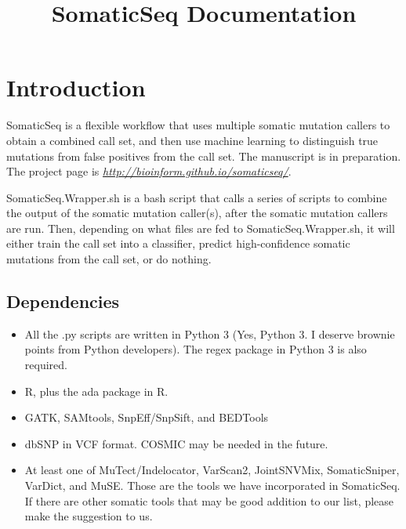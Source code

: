 \documentclass[10pt,letterpaper]{article}
\title{SomaticSeq Documentation}
\begin{document}
\maketitle



\begin{sloppypar}




\section{Introduction}

SomaticSeq is a flexible workflow that uses multiple somatic mutation callers to obtain a combined call set, and then use machine learning to distinguish true mutations from false positives from the call set. The manuscript is in preparation. The project page is \href{http://bioinform.github.io/somaticseq/}{\textit{http://bioinform.github.io/somaticseq/}}. 

SomaticSeq.Wrapper.sh is a bash script that calls a series of scripts to combine the output of the somatic mutation caller(s), after the somatic mutation callers are run. Then, depending on what files are fed to SomaticSeq.Wrapper.sh, it will either train the call set into a classifier, predict high-confidence somatic mutations from the call set, or do nothing. 

\subsection{Dependencies}

\begin{itemize}

\item
All the .py scripts are written in Python 3 (Yes, Python 3. I deserve brownie points from Python developers). The regex package in Python 3 is also required. 

\item
R, plus the ada package in R.

\item
GATK, SAMtools, SnpEff/SnpSift, and BEDTools

\item
dbSNP in VCF format. COSMIC may be needed in the future.

\item
At least one of MuTect/Indelocator, VarScan2, JointSNVMix, SomaticSniper, VarDict, and MuSE. Those are the tools we have incorporated in SomaticSeq. If there are other somatic tools that may be good addition to our list, please make the suggestion to us. 


\end{itemize}
\end{sloppypar}
\end{document}
